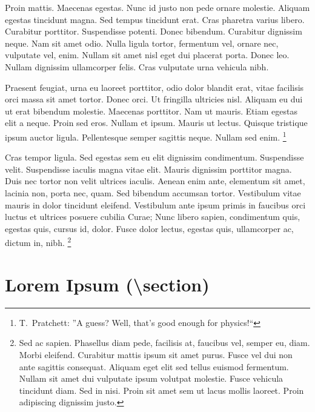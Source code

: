\documentclass[article,colorback,accentcolor=tud4c]{tudreport}
\begin{document}
    Proin mattis. Maecenas egestas. Nunc id justo non pede ornare molestie. Aliquam egestas tincidunt magna. Sed tempus tincidunt erat. Cras pharetra varius libero. Curabitur porttitor. Suspendisse potenti. Donec bibendum. Curabitur dignissim neque. Nam sit amet odio. Nulla ligula tortor, fermentum vel, ornare nec, vulputate vel, enim. Nullam sit amet nisl eget dui placerat porta. Donec leo. Nullam dignissim ullamcorper felis. Cras vulputate urna vehicula nibh.
    
    Praesent feugiat, urna eu laoreet porttitor, odio dolor blandit erat, vitae facilisis orci massa sit amet tortor. Donec orci. Ut fringilla ultricies nisl. Aliquam eu dui ut erat bibendum molestie. Maecenas porttitor. Nam ut mauris. Etiam egestas elit a neque. Proin sed eros. Nullam et ipsum. Mauris ut lectus. Quisque tristique ipsum auctor ligula. Pellentesque semper sagittis neque. Nullam sed enim.%
    \footnote{T.\ Pratchett: ''A guess? Well, that's good enough for physics!{``}}

    Cras tempor ligula. Sed egestas sem eu elit dignissim condimentum. Suspendisse velit. Suspendisse iaculis magna vitae elit. Mauris dignissim porttitor magna. Duis nec tortor non velit ultrices iaculis. Aenean enim ante, elementum sit amet, lacinia non, porta nec, quam. Sed bibendum accumsan tortor. Vestibulum vitae mauris in dolor tincidunt eleifend. Vestibulum ante ipsum primis in faucibus orci luctus et ultrices posuere cubilia Curae; Nunc libero sapien, condimentum quis, egestas quis, cursus id, dolor. Fusce dolor lectus, egestas quis, ullamcorper ac, dictum in, nibh.%
    \footnote{Sed ac sapien. Phasellus diam pede, facilisis at, faucibus vel, semper eu, diam. Morbi eleifend. Curabitur mattis ipsum sit amet purus. Fusce vel dui non ante sagittis consequat. Aliquam eget elit sed tellus euismod fermentum. Nullam sit amet dui vulputate ipsum volutpat molestie. Fusce vehicula tincidunt diam. Sed in nisi. Proin sit amet sem ut lacus mollis laoreet. Proin adipiscing dignissim justo.}

  \section{Lorem Ipsum (\textbackslash section)}
\end{document}
